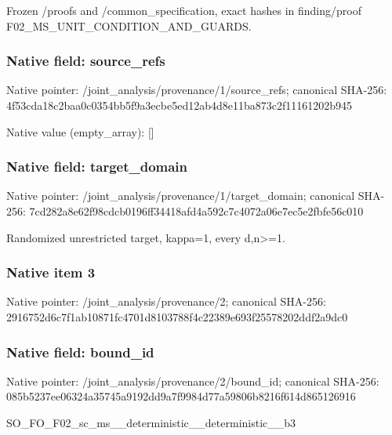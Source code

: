 \documentclass[10pt,a4paper]{article}
\begin{document}
\begingroup\raggedright\sloppy Frozen /\allowbreak{}proofs and /\allowbreak{}common\_\allowbreak{}specification,\allowbreak{} exact hashes in finding/\allowbreak{}proof F02\_\allowbreak{}MS\_\allowbreak{}UNIT\_\allowbreak{}CONDITION\_\allowbreak{}AND\_\allowbreak{}GUARDS.\par\endgroup

\subsubsection{Native field: source\_\allowbreak{}refs}
Native pointer: /joint\_\allowbreak{}analysis/provenance/1/source\_\allowbreak{}refs; canonical SHA-256: 4f53cda18c2baa0c0354bb5f9a3ecbe5ed12ab4d8e11ba873c2f11161202b945

Native value (empty\_\allowbreak{}array): []

\subsubsection{Native field: target\_\allowbreak{}domain}
Native pointer: /joint\_\allowbreak{}analysis/provenance/1/target\_\allowbreak{}domain; canonical SHA-256: 7cd282a8e62f98cdcb0196ff34418afd4a592c7c4072a06e7ec5e2fbfe56c010

\begingroup\raggedright\sloppy Randomized unrestricted target,\allowbreak{} kappa=\allowbreak{}1,\allowbreak{} every d,\allowbreak{}n>=\allowbreak{}1.\par\endgroup

\subsubsection{Native item 3}
Native pointer: /joint\_\allowbreak{}analysis/provenance/2; canonical SHA-256: 2916752d6c7f1ab10871fc4701d8103788f4c22389e693f25578202ddf2a9dc0

\subsubsection{Native field: bound\_\allowbreak{}id}
Native pointer: /joint\_\allowbreak{}analysis/provenance/2/bound\_\allowbreak{}id; canonical SHA-256: 085b5237ee06324a35745a9192dd9a7f9984d77a59806b8216f614d865126916

\begingroup\raggedright\sloppy SO\_\allowbreak{}FO\_\allowbreak{}F02\_\allowbreak{}sc\_\allowbreak{}ms\_\allowbreak{}\_\allowbreak{}deterministic\_\allowbreak{}\_\allowbreak{}deterministic\_\allowbreak{}\_\allowbreak{}b3\par\endgroup
\end{document}
